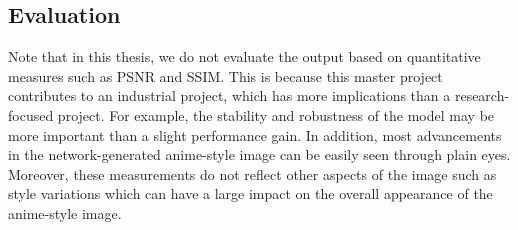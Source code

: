 \subsection{Evaluation}
Note that in this thesis, we do not evaluate the output based on quantitative measures such as PSNR and SSIM. This is because this master project contributes to an industrial project, which has more implications than a research-focused project. For example, the stability and robustness of the model may be more important than a slight performance gain. In addition, most advancements in the network-generated anime-style image can be easily seen through plain eyes. Moreover, these measurements do not reflect other aspects of the image such as style variations which can have a large impact on the overall appearance of the anime-style image.







